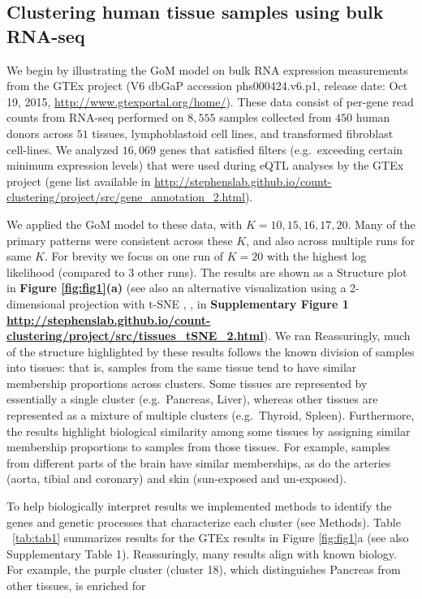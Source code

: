 \subsection{Clustering human tissue samples using bulk RNA-seq}

We begin by illustrating the GoM model on bulk RNA expression measurements from the GTEx project (V6 dbGaP accession phs000424.v6.p1, release date: Oct 19, 2015, \url{http://www.gtexportal.org/home/}).  These data consist of per-gene read counts from RNA-seq performed on $8,555$ samples collected from $450$ human donors across $51$ tissues, lymphoblastoid cell lines, and transformed fibroblast cell-lines. We analyzed $16,069$ genes that satisfied filters (e.g.~exceeding certain minimum expression levels) that were used during eQTL analyses by the GTEx project (gene list available in \url{http://stephenslab.github.io/count-clustering/project/src/gene_annotation_2.html}). 

We applied the GoM model to these data, with $K=10,15, 16, 17, 20$. Many of the primary patterns were consistent across these $K$, and also across multiple runs for same $K$. For brevity we focus on one run of $K=20$ with the highest log likelihood (compared to 3 other runs). The results are shown as a Structure plot in \textbf{Figure \ref{fig:fig1}(a)} (see also an alternative visualization using a 2-dimensional projection with t-SNE \cite{Maaten2008}, \cite{Maaten2014}, in \textbf{Supplementary Figure 1 \url{http://stephenslab.github.io/count-clustering/project/src/tissues_tSNE_2.html}}). We ran Reassuringly, much of the structure highlighted by these results follows the known division of samples into tissues: that is, samples from the same tissue tend to have similar membership proportions across clusters. Some tissues are represented by essentially a single cluster (e.g.~Pancreas, Liver), whereas other tissues are represented as a mixture of multiple clusters (e.g.~Thyroid, Spleen). Furthermore, the results highlight biological similarity among some tissues by assigning similar membership proportions to samples from those tissues.  For example, samples from different parts of the brain have similar memberships, as do the arteries (aorta, tibial and coronary) and skin (sun-exposed and un-exposed). 


To help biologically interpret results we implemented methods to identify the genes and genetic processes that characterize each cluster (see Methods).
Table ~\ref{tab:tab1} summarizes results for the GTEx results in Figure \ref{fig:fig1}a (see also Supplementary Table 1). Reassuringly, many results align with known biology. For example,  the purple cluster (cluster 18), which distinguishes Pancreas from other tissues, is enriched for

